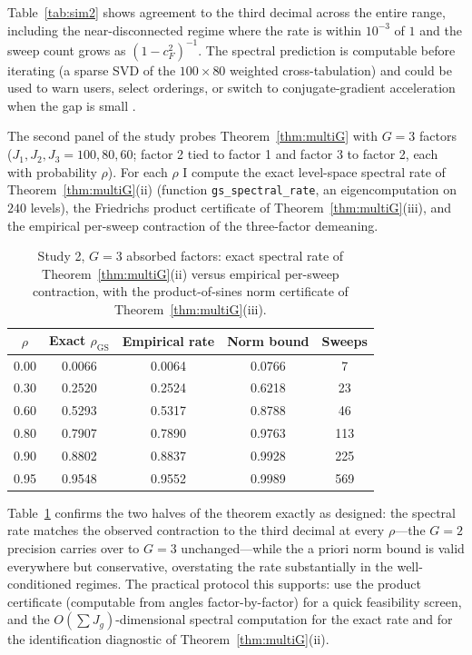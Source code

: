 \documentclass[11pt]{article}
\begin{document}
Table~\ref{tab:sim2} shows agreement to the third decimal across the
entire range, including the near-disconnected regime where the rate is
within $10^{-3}$ of $1$ and the sweep count grows as
$(1 - c_F^2)^{-1}$.  The spectral prediction is computable before
iterating (a sparse SVD of the $100 \times 80$ weighted cross-tabulation)
and could be used to warn users, select orderings, or switch to
conjugate-gradient acceleration when the gap is small
\citep{gaure2013,correia2016}.

The second panel of the study probes Theorem~\ref{thm:multiG} with
$G = 3$ factors ($J_1, J_2, J_3 = 100, 80, 60$; factor 2 tied to factor
1 and factor 3 to factor 2, each with probability $\rho$).  For each
$\rho$ I compute the exact level-space spectral rate of
Theorem~\ref{thm:multiG}(ii) (function \texttt{gs\_spectral\_rate},
an eigencomputation on $240$ levels), the Friedrichs product certificate
of Theorem~\ref{thm:multiG}(iii), and the empirical per-sweep
contraction of the three-factor demeaning.

\begin{table}[t]
\centering
\caption{Study 2, $G = 3$ absorbed factors: exact spectral rate of
Theorem~\ref{thm:multiG}(ii) versus empirical per-sweep contraction,
with the product-of-sines norm certificate of
Theorem~\ref{thm:multiG}(iii).}
\label{tab:sim2g3}
\small
\begin{tabular}{ccccc}
\toprule
$\rho$ & Exact $\rho_{\mathrm{GS}}$ & Empirical rate & Norm bound &
Sweeps \\
\midrule
0.00 & 0.0066 & 0.0064 & 0.0766 & 7 \\
0.30 & 0.2520 & 0.2524 & 0.6218 & 23 \\
0.60 & 0.5293 & 0.5317 & 0.8788 & 46 \\
0.80 & 0.7907 & 0.7890 & 0.9763 & 113 \\
0.90 & 0.8802 & 0.8837 & 0.9928 & 225 \\
0.95 & 0.9548 & 0.9552 & 0.9989 & 569 \\
\bottomrule
\end{tabular}
\end{table}

Table~\ref{tab:sim2g3} confirms the two halves of the theorem exactly
as designed: the spectral rate matches the observed contraction to the
third decimal at every $\rho$---the $G = 2$ precision carries over to
$G = 3$ unchanged---while the a priori norm bound is valid everywhere
but conservative, overstating the rate substantially in the
well-conditioned regimes.  The practical protocol this supports: use the
product certificate (computable from angles factor-by-factor) for a
quick feasibility screen, and the $O(\sum J_g)$-dimensional spectral
computation for the exact rate and for the identification diagnostic of
Theorem~\ref{thm:multiG}(ii).
\end{document}
